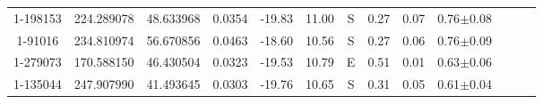 \begin{table*}
\begin{tabular}{ccccccccccccc}
1-198153 & 224.289078 & 48.633968 & 0.0354 & -19.83 & 11.00 & S & 0.27 & 0.07 & 0.76$\pm$0.08\\
1-91016 & 234.810974 & 56.670856 & 0.0463 & -18.60 & 10.56 & S & 0.27 & 0.06 & 0.76$\pm$0.09\\
1-279073 & 170.588150 & 46.430504 & 0.0323 & -19.53 & 10.79 & E & 0.51 & 0.01 & 0.63$\pm$0.06\\
1-135044 & 247.907990 & 41.493645 & 0.0303 & -19.76 & 10.65 & S & 0.31 & 0.05 & 0.61$\pm$0.04\\
\end{tabular}
\label{tableagns}
\end{table*}
